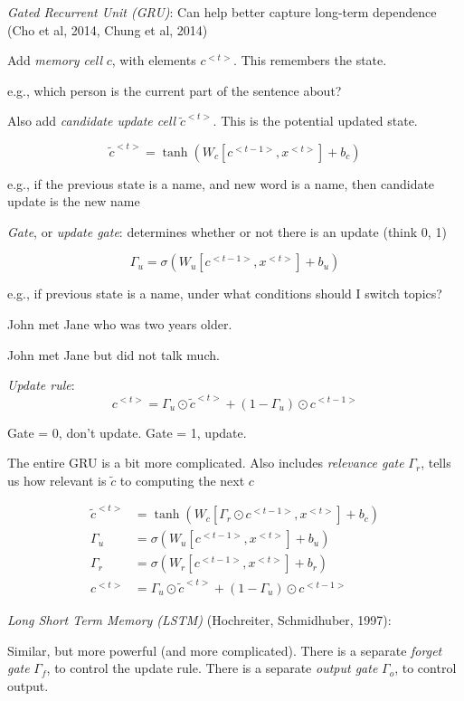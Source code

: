 \documentclass[english]{article}
\begin{document}
\item \emph{Gated Recurrent Unit (GRU)}: Can help better capture long-term dependence (Cho et al, 2014, Chung et al, 2014) 

Add \emph{memory cell} $c$, with elements $c^{<t>}$. This remembers the state.

e.g., which person is the current part of the sentence about?


Also add \emph{candidate update cell} $\tilde c^{<t>}$. This is the potential updated state. 

$$\tilde c^{<t>} = \tanh(W_c [c^{<t-1>},x^{<t>}]+b_c)$$

e.g., if the previous state is a name, and new word is a name, then candidate update is the new name

\emph{Gate}, or \emph{update gate}: determines whether or not there is an update (think 0, 1)

$$\Gamma_u = \sigma(W_u [c^{<t-1>},x^{<t>}]+b_u)$$

e.g., if previous state is a name, under what conditions should I switch topics? 

\benum 
\item John met Jane who was two years older. 
\item John met Jane but did not talk much.
\eenum 



\emph{Update rule}: 
$$c^{<t>} = \Gamma_u \odot \tilde c^{<t>} + (1-\Gamma_u) \odot c^{<t-1>}$$

Gate = 0, don't update. Gate = 1, update.

The entire GRU is a bit more complicated. Also includes \emph{relevance gate} $\Gamma_r$, tells us how relevant is $\tilde c$ to computing the next $c$ 

\begin{align*}
\tilde c^{<t>} &= \tanh(W_c [\Gamma_r  \odot c^{<t-1>},x^{<t>}]+b_c)\\
\Gamma_u &= \sigma(W_u [c^{<t-1>},x^{<t>}]+b_u)\\
\Gamma_r &= \sigma(W_r [c^{<t-1>},x^{<t>}]+b_r)\\
c^{<t>} & = \Gamma_u \odot \tilde c^{<t>} + (1-\Gamma_u) \odot c^{<t-1>}
\end{align*}


\item \emph{Long Short Term Memory (LSTM)} (Hochreiter, Schmidhuber, 1997): 

Similar, but more powerful (and more complicated). There is a separate \emph{forget gate} $\Gamma_f$, to control the update rule. There is a separate \emph{output gate}  $\Gamma_o$, to control output. 
\end{document}
